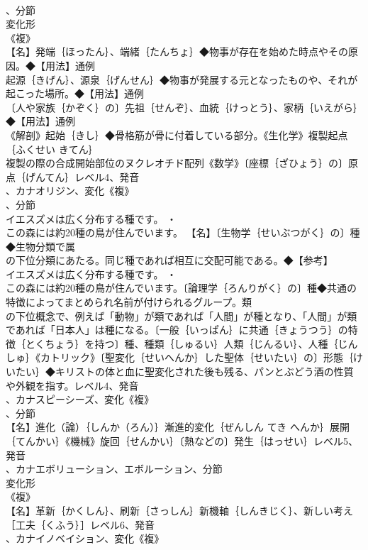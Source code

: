 \documentclass[8pt]{extreport}
\begin{document}
\begin{CJK}{UTF8}{min}
\\	、分節
\\	変化形 
\\	《複》
\\	【名】発端｛ほったん｝、端緒｛たんちょ｝◆物事が存在を始めた時点やその原因。◆【用法】通例
\\	起源｛きげん｝、源泉｛げんせん｝◆物事が発展する元となったものや、それが起こった場所。◆【用法】通例
\\	〔人や家族｛かぞく｝の〕先祖｛せんぞ｝、血統｛けっとう｝、家柄｛いえがら｝◆【用法】通例
\\	《解剖》起始｛きし｝◆骨格筋が骨に付着している部分。《生化学》複製起点｛ふくせい きてん｝
\\	複製の際の合成開始部位のヌクレオチド配列《数学》〔座標｛ざひょう｝の〕原点｛げんてん｝レベル4、発音
\\	、カナオリジン、変化《複》
\\	、分節
\\	イエスズメは広く分布する種です。 ・
\\	この森には約20種の鳥が住んでいます。		【名】〔生物学｛せいぶつがく｝の〕種◆生物分類で属
\\	の下位分類にあたる。同じ種であれば相互に交配可能である。◆【参考】
\\	イエスズメは広く分布する種です。 ・
\\	この森には約20種の鳥が住んでいます。〔論理学｛ろんりがく｝の〕種◆共通の特徴によってまとめられ名前が付けられるグループ。類
\\	の下位概念で、例えば「動物」が類であれば「人間」が種となり、「人間」が類であれば「日本人」は種になる。〔一般｛いっぱん｝に共通｛きょうつう｝の特徴｛とくちょう｝を持つ〕種、種類｛しゅるい｝人類｛じんるい｝、人種｛じんしゅ｝《カトリック》〔聖変化｛せいへんか｝した聖体｛せいたい｝の〕形態｛けいたい｝◆キリストの体と血に聖変化された後も残る、パンとぶどう酒の性質や外観を指す。レベル4、発音
\\	、カナスピーシーズ、変化《複》
\\	、分節
\\	【名】進化（論）｛しんか（ろん）｝漸進的変化｛ぜんしん てき へんか｝展開｛てんかい｝《機械》旋回｛せんかい｝〔熱などの〕発生｛はっせい｝レベル5、発音
\\	、カナエボリューション、エボルーション、分節
\\	変化形 
\\	《複》
\\	【名】革新｛かくしん｝、刷新｛さっしん｝新機軸｛しんきじく｝、新しい考え［工夫｛くふう｝］レベル6、発音
\\	、カナイノベイション、変化《複》

\end{CJK}
\end{document}
